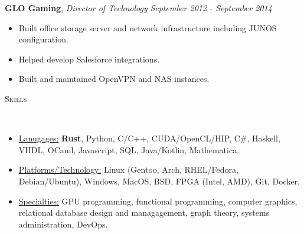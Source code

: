 \documentclass[9pt]{article}
\newenvironment{changemargin}[2]{%
  \begin{list}{}{%
    \setlength{\topsep}{0pt}%
    \setlength{\leftmargin}{#1}%
    \setlength{\rightmargin}{#2}%
    \setlength{\listparindent}{\parindent}%
    \setlength{\itemindent}{\parindent}%
    \setlength{\parsep}{\parskip}%
  }%
  \item[]}{\end{list}
}
\newcommand{\lineover}{
	\begin{changemargin}{-0.05in}{-0.05in}
		\vspace*{-8pt}
		\hrulefill \\
		\vspace*{-2pt}
	\end{changemargin}
}
\newcommand{\header}[1]{
	\begin{changemargin}{-0.5in}{-0.5in}
		\scshape{#1}\\
  	\lineover
	\end{changemargin}
}
\newenvironment{body} {
	\vspace*{-16pt}
	\begin{changemargin}{-0.25in}{-0.5in}
  }	
	{\end{changemargin}
}
\begin{document}
\begin{body}
	\textbf{GLO Gaming}, \emph{Director of Technology} \hfill \emph{September 2012 - September 2014}\\
	\vspace*{-3pt}
	\begin{itemize} \itemsep -0pt %
		\item Built office storage server and network infrastructure including JUNOS configuration.
		\item Helped develop Salesforce integrations.
		\item Built and maintained OpenVPN and NAS instances.
	\end{itemize}
	\vspace*{-2pt}

	\smallskip
	\vspace*{-3pt}
	\vspace*{-5pt}
	\smallskip
\end{body}


\smallskip

\header{Skills}
\smallskip
\begin{body}
	\vspace{14pt}
	\begin{itemize} \itemsep -0pt

		\item \uline{Lanugages:} \textbf{Rust}, Python, C/C++, CUDA/OpenCL/HIP, C\#, Haskell, VHDL, OCaml, Javascript, SQL, Java/Kotlin, Mathematica.

		\item \uline{Platforms/Technology:} Linux (Gentoo, Arch, RHEL/Fedora,
		Debian/Ubuntu), Windows, MacOS,
		      BSD, FPGA (Intel, AMD), Git, Docker.
		\item \uline{Specialties:} GPU programming, functional programming, computer graphics, relational database design and managagement, graph theory, systems administration, DevOps.
	\end{itemize}
\end{body}
\end{document}
